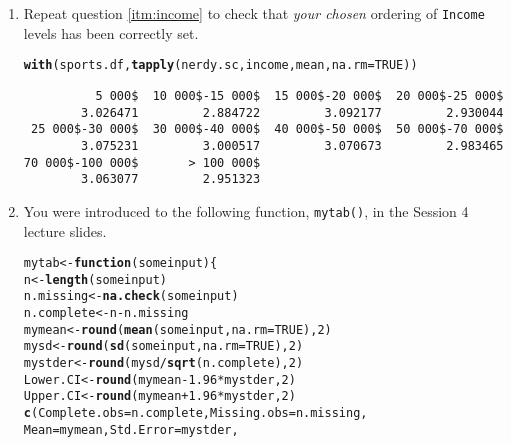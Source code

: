 \documentclass[12pt,a4paper]{article}\usepackage[]{graphicx}\usepackage[]{color}
\makeatletter
\newcommand{\hlnum}[1]{\textcolor[rgb]{0.686,0.059,0.569}{#1}}%
\newcommand{\hlopt}[1]{\textcolor[rgb]{0,0,0}{#1}}%
\newcommand{\hlstd}[1]{\textcolor[rgb]{0.345,0.345,0.345}{#1}}%
\newcommand{\hlkwa}[1]{\textcolor[rgb]{0.161,0.373,0.58}{\textbf{#1}}}%
\newcommand{\hlkwb}[1]{\textcolor[rgb]{0.69,0.353,0.396}{#1}}%
\newcommand{\hlkwc}[1]{\textcolor[rgb]{0.333,0.667,0.333}{#1}}%
\newcommand{\hlkwd}[1]{\textcolor[rgb]{0.737,0.353,0.396}{\textbf{#1}}}%
\newenvironment{kframe}{%
 \def\at@end@of@kframe{}%
 \ifinner\ifhmode%
  \def\at@end@of@kframe{\end{minipage}}%
  \begin{minipage}{\columnwidth}%
 \fi\fi%
 \def\FrameCommand##1{\hskip\@totalleftmargin \hskip-\fboxsep
 \colorbox{shadecolor}{##1}\hskip-\fboxsep
     \hskip-\linewidth \hskip-\@totalleftmargin \hskip\columnwidth}%
 \MakeFramed {\advance\hsize-\width
   \@totalleftmargin\z@ \linewidth\hsize
   \@setminipage}}%
 {\par\unskip\endMakeFramed%
 \at@end@of@kframe}
\newenvironment{knitrout}{}{} %
\makeatother
\begin{document}
\begin{enumerate}
\item Repeat question \ref{itm:income} to check that {\em your chosen} ordering of \texttt{Income} levels has been correctly set.
\begin{knitrout}
\color{fgcolor}\begin{kframe}
\begin{alltt}
\hlkwd{with}\hlstd{(sports.df,} \hlkwd{tapply}\hlstd{(nerdy.sc, income, mean,} \hlkwc{na.rm} \hlstd{=} \hlnum{TRUE}\hlstd{))}
\end{alltt}
\begin{verbatim}
          5 000$  10 000$-15 000$  15 000$-20 000$  20 000$-25 000$ 
        3.026471         2.884722         3.092177         2.930044 
 25 000$-30 000$  30 000$-40 000$  40 000$-50 000$  50 000$-70 000$ 
        3.075231         3.000517         3.070673         2.983465 
70 000$-100 000$       > 100 000$ 
        3.063077         2.951323 
\end{verbatim}
\end{kframe}
\end{knitrout}
\item You were introduced to the following function, \texttt{mytab()}, in the Session 4 lecture slides.
\begin{knitrout}
\color{fgcolor}\begin{kframe}
\begin{alltt}
\hlstd{mytab} \hlkwb{<-} \hlkwa{function}\hlstd{(}\hlkwc{someinput}\hlstd{)\{}
 \hlstd{n} \hlkwb{<-} \hlkwd{length}\hlstd{(someinput)}
 \hlstd{n.missing} \hlkwb{<-} \hlkwd{na.check}\hlstd{(someinput)}
 \hlstd{n.complete} \hlkwb{<-} \hlstd{n} \hlopt{-} \hlstd{n.missing}
 \hlstd{mymean} \hlkwb{<-} \hlkwd{round}\hlstd{(}\hlkwd{mean}\hlstd{(someinput,} \hlkwc{na.rm} \hlstd{=} \hlnum{TRUE}\hlstd{),} \hlnum{2}\hlstd{)}
 \hlstd{mysd} \hlkwb{<-} \hlkwd{round}\hlstd{(}\hlkwd{sd}\hlstd{(someinput,} \hlkwc{na.rm} \hlstd{=} \hlnum{TRUE}\hlstd{),} \hlnum{2}\hlstd{)}
 \hlstd{mystder} \hlkwb{<-} \hlkwd{round}\hlstd{(mysd}\hlopt{/}\hlkwd{sqrt}\hlstd{(n.complete),} \hlnum{2}\hlstd{)}
 \hlstd{Lower.CI} \hlkwb{<-} \hlkwd{round}\hlstd{(mymean} \hlopt{-} \hlnum{1.96}\hlopt{*}\hlstd{mystder,} \hlnum{2}\hlstd{)}
 \hlstd{Upper.CI} \hlkwb{<-} \hlkwd{round}\hlstd{(mymean} \hlopt{+} \hlnum{1.96}\hlopt{*}\hlstd{mystder,} \hlnum{2}\hlstd{)}
 \hlkwd{c}\hlstd{(}\hlkwc{Complete.obs} \hlstd{= n.complete,} \hlkwc{Missing.obs} \hlstd{= n.missing,}
   \hlkwc{Mean} \hlstd{= mymean,} \hlkwc{Std.Error} \hlstd{= mystder,}

\end{alltt}
\end{kframe}
\end{knitrout}
\end{enumerate}
\end{document}
